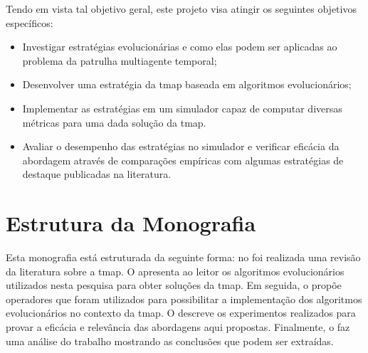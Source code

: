Tendo em vista tal objetivo geral, este projeto visa atingir os seguintes 
objetivos específicos:

\begin{itemize}
	\item Investigar estratégias evolucionárias e como elas podem ser aplicadas 
		ao problema da patrulha multiagente temporal;
	\item Desenvolver uma estratégia da \ac{tmap} baseada em algoritmos  
		evolucionários;
	\item Implementar as estratégias em um simulador capaz de computar diversas 
		métricas para uma dada solução da \ac{tmap}.
	\item Avaliar o desempenho das estratégias no simulador e verificar eficácia
		da abordagem através de comparações empíricas com algumas estratégias de 
		destaque publicadas na literatura.
\end{itemize}

\section{Estrutura da Monografia}

Esta monografia está estruturada da seguinte forma: no  
foi realizada uma revisão da literatura sobre a \ac{tmap}. O  
apresenta ao leitor os algoritmos evolucionários utilizados nesta pesquisa para 
obter soluções da \ac{tmap}. Em seguida, o  propõe  
operadores que foram utilizados para possibilitar a implementação dos algoritmos 
evolucionários no contexto da \ac{tmap}. O  descreve os 
experimentos realizados para provar a eficácia e relevância das abordagens aqui 
propostas. Finalmente, o  faz uma análise do trabalho 
mostrando as conclusões que podem ser extraídas.